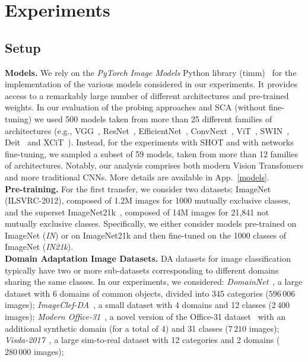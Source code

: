 \documentclass{article}
\begin{document}
\section{Experiments}

\subsection{Setup}
\textbf{Models.} We rely on the \textit{PyTorch Image Models} Python library (timm)~\citep{rw2019timm} for the implementation of the various models considered in our experiments.
It provides access to a remarkably large number of different architectures and pre-trained weights. 
In our evaluation of the probing approaches and SCA (without fine-tuning) we used 500 models taken from more than 25 different families of architectures (e.g., VGG~\citep{vgg}, ResNet~\citep{resnet}, EfficientNet~\citep{efficientnet}, ConvNext~\citep{convnext}, ViT~\citep{dosovitskiy2020image}, SWIN~\citep{swin}, Deit~\citep{deit} and XCiT~\citep{xcit}). Instead, for the experiments with SHOT and with networks fine-tuning, we sampled a subset of 59 models, taken from more than 12 families of architectures. Notably, our analysis comprises both modern Vision Transfomers and more traditional CNNs. 
More details are available in App.~\ref{models}.\\
\textbf{Pre-training.} For the first transfer, we consider two datasets: ImageNet (ILSVRC-2012), composed of 1.2M images for 1000 mutually exclusive classes, and the superset ImageNet21k~\citep{deng2009imagenet}, composed of 14M images for 21,841 not mutually exclusive classes. 
Specifically, we either consider models pre-trained on ImageNet (\textit{IN}) or on ImageNet21k and then fine-tuned on the 1000 classes of ImageNet (\textit{IN21k}).\\
\textbf{Domain Adaptation Image Datasets.} DA datasets for image classification typically have two or more sub-datasets corresponding to different domains sharing the same classes.
 In our experiments, we considered:
 \textit{DomainNet}~\citep{peng2019moment}, a large dataset with 6 domains of common objects, divided into 345 categories ($596\,006$ images);
 \textit{ImageClef-DA}~\citep{long2017deep}, a small dataset with 4 domains and 12 classes ($2\,400$ images);
 \textit{Modern Office-31}~\citep{ringwald2021adaptiope}, a novel version of the Office-31 dataset~\citep{saenko2010adapting} with an additional synthetic domain (for a total of 4) and 31 classes ($7\,210$ images);
 \textit{Visda-2017}~\citep{peng2017visda}, a large sim-to-real dataset  with 12 categories and 2 domains ($280\,000$ images);
\end{document}
